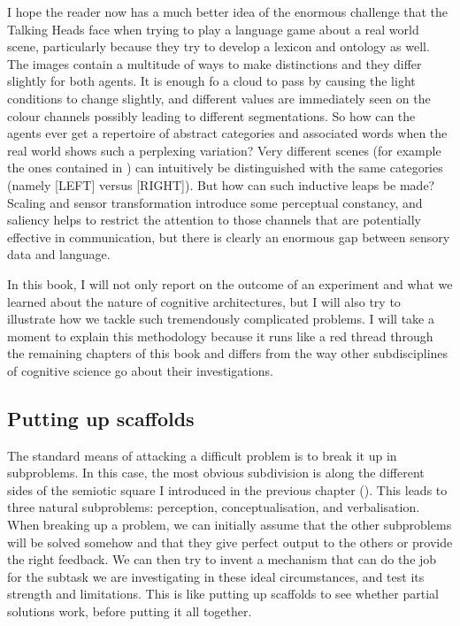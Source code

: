 I hope the reader now has a much better idea of the enormous challenge
that the Talking Heads face when trying to play a language 
game about a real world scene, particularly
because they try to develop a lexicon and ontology 
as well. The images contain a multitude of ways 
to make distinctions and they differ slightly for both agents. 
It is enough fo a cloud to pass by causing the light conditions
to change slightly, and different values are immediately seen 
on the colour channels possibly leading to different segmentations.
So how can the agents ever get a repertoire of abstract categories and 
associated words when the real world shows such a perplexing 
variation? Very different scenes (for example the ones contained
in ) can intuitively be distinguished with the same 
categories (namely [LEFT] versus [RIGHT]). But how can such 
inductive leaps be made? Scaling and sensor transformation 
introduce some perceptual constancy, and saliency helps to 
restrict the attention to those
channels that are potentially effective in communication, but there 
is clearly an enormous gap between sensory data and language. 

In this book, I will 
not only report on the outcome of an experiment and 
what we learned about the nature of cognitive architectures, but 
I will also try
to illustrate how we tackle such tremendously complicated problems. 
I will take a moment to explain this methodology because it runs like 
a red thread through the remaining chapters of this book and 
differs from the way other subdisciplines of cognitive science 
go about their investigations. 

\subsection{Putting up scaffolds}

The standard means of attacking a difficult problem is to 
break it up in subproblems. In this case, the most obvious
subdivision is along the different sides
of the semiotic square I introduced in the 
previous chapter (). This 
leads to three natural subproblems: perception, conceptualisation, 
and verbalisation. When breaking up a problem, we can initially assume that the 
other subproblems will be solved somehow and that they give perfect
output to the others
or provide the right feedback. We can then try to invent a mechanism that
can do the job for the subtask we are investigating in these ideal circumstances, 
and test its strength and limitations. This is like putting up
scaffolds to see whether partial solutions work, before putting 
it all together. 


